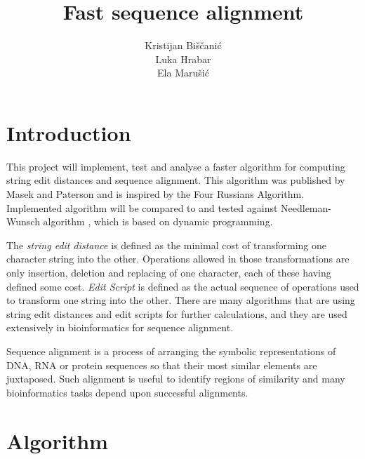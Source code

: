 \documentclass[times, utf8, seminar, numeric]{fer}
\begin{document}
\title{Fast sequence alignment}

\author{Kristijan Biščanić \\ Luka Hrabar \\ Ela Marušić}

\maketitle

\tableofcontents

\chapter{Introduction}
This project will implement, test and analyse a faster algorithm for computing string edit distances and sequence alignment. This algorithm was published by Masek and Paterson \cite{masek1980faster} and is inspired by the Four Russians Algorithm. Implemented algorithm will be compared to and tested against Needleman-Wunsch algorithm \cite{needleman1970general}, which is based on dynamic programming.

The \textit{string edit distance} is defined as the minimal cost of transforming one character string into the other. Operations allowed in those transformations are only insertion, deletion and replacing of one character, each of these having defined some cost. \textit{Edit Script} is defined as the actual sequence of operations used to transform one string into the other. There are many algorithms that are using string edit distances and edit scripts for further calculations, and they are used extensively in bioinformatics for sequence alignment.

Sequence alignment is a process of arranging the symbolic representations of DNA, RNA or protein sequences so that their most similar elements are juxtaposed. Such alignment is useful to identify regions of similarity and many bioinformatics tasks depend upon successful alignments.

\chapter{Algorithm}
\end{document}
